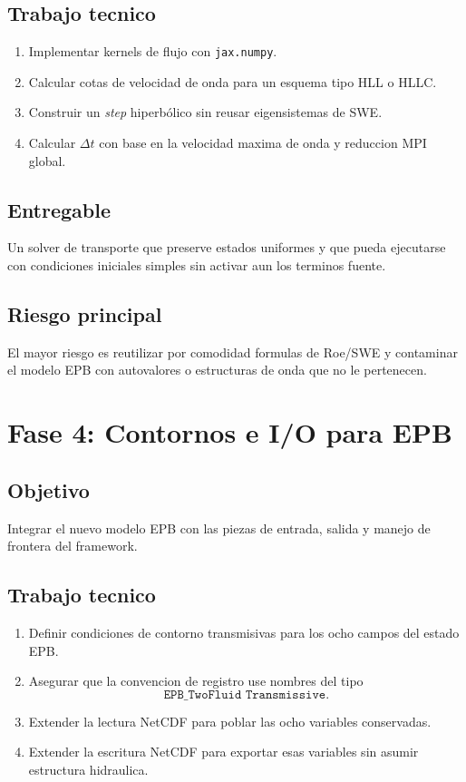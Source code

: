 \documentclass[11pt]{article}
\begin{document}
\subsection*{Trabajo tecnico}

\begin{enumerate}[label=\arabic*.]
    \item Implementar kernels de flujo con \texttt{jax.numpy}.
    \item Calcular cotas de velocidad de onda para un esquema tipo HLL o HLLC.
    \item Construir un \emph{step} hiperb\'olico sin reusar eigensistemas de SWE.
    \item Calcular $\Delta t$ con base en la velocidad maxima de onda y reduccion MPI global.
\end{enumerate}

\subsection*{Entregable}

Un solver de transporte que preserve estados uniformes y que pueda ejecutarse con condiciones iniciales simples sin activar aun los terminos fuente.

\subsection*{Riesgo principal}

El mayor riesgo es reutilizar por comodidad formulas de Roe/SWE y contaminar el modelo EPB con autovalores o estructuras de onda que no le pertenecen.

\section{Fase 4: Contornos e I/O para EPB}

\subsection*{Objetivo}

Integrar el nuevo modelo EPB con las piezas de entrada, salida y manejo de frontera del framework.

\subsection*{Trabajo tecnico}

\begin{enumerate}[label=\arabic*.]
    \item Definir condiciones de contorno transmisivas para los ocho campos del estado EPB.
    \item Asegurar que la convencion de registro use nombres del tipo
    \begin{equation}
    \texttt{EPB\_TwoFluid Transmissive}.
    \end{equation}
    \item Extender la lectura NetCDF para poblar las ocho variables conservadas.
    \item Extender la escritura NetCDF para exportar esas variables sin asumir estructura hidraulica.
\end{enumerate}
\end{document}
